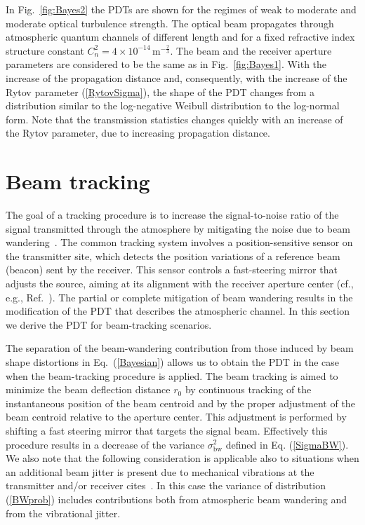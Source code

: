 \documentclass[aps,pra,twocolumn,a4paper,nofootinbib,preprintnumbers] {revtex4-1}
\begin{document}
	 In Fig.~\ref{fig:Bayes2} the PDTs  are shown for the regimes of weak to moderate and moderate optical turbulence strength.
	 The optical beam propagates through  atmospheric quantum channels of different length and for a fixed refractive index structure constant $C_n^2{=4{\times}10^{-14}}\,\text{m}^{-\frac{2}{3}}$.
	 The beam and the receiver aperture  parameters are considered to be the same as in Fig.~\ref{fig:Bayes1}.
	 With the increase of the propagation distance and, consequently, with the increase of the Rytov parameter (\ref{RytovSigma}), the shape of the PDT changes from a distribution similar to the log-negative Weibull distribution to the log-normal form.
	 Note that  the transmission statistics changes quickly  with an increase of the Rytov parameter, due to increasing propagation distance.



\section{Beam tracking}\label{sec:Tracking}

	The goal of a tracking procedure is to increase the signal-to-noise ratio of the signal transmitted through the atmosphere  by mitigating the noise due to beam wandering~\cite{FriedYura}.
	The common  tracking system  involves  a position-sensitive sensor on the transmitter site, which detects the position variations of a reference beam (beacon) sent by the receiver.
	This sensor controls a fast-steering mirror that adjusts the source, aiming at its alignment with the receiver aperture center  (cf., e.g., Ref.~\cite{Ma2012, Yin2017, Kaushal}).
	The partial or complete mitigation of beam wandering results in the modification of the PDT that describes the atmospheric channel.
	In this section we derive the PDT for beam-tracking scenarios.


	The separation of the beam-wandering contribution from those induced by beam shape distortions  in Eq.~(\ref{Bayesian}) allows us to obtain the PDT in the case when the beam-tracking procedure is applied.
	The beam tracking  is aimed to minimize the beam deflection distance $r_0$ by continuous tracking of the instantaneous  position of the beam centroid and by the proper adjustment of the beam centroid relative to the aperture center.
	This adjustment is performed by shifting a fast steering mirror that targets the signal beam.
	Effectively this procedure  results in a decrease of the  variance $\sigma_{\mathrm{bw}}^2$ defined in Eq. (\ref{SigmaBW}).
	We also note that the following consideration is applicable also to situations when an additional beam jitter is present due to mechanical vibrations at the transmitter and/or receiver cites~\cite{Arnon}.
	In this case the variance  of distribution (\ref{BWprob}) includes contributions both from atmospheric beam wandering and from the vibrational  jitter.
\end{document}
